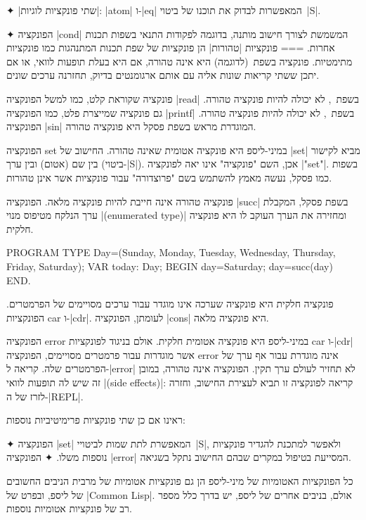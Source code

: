 ✦ \ע|שתי פונקציות לוגיות|: \E|atom| ו-\E|eq| המאפשרות לבדוק את תוכנו של
ביטוי~\E|S|.

✦ הפונקציה \E|cond| המשמשת לצורך חישוב מותנה, בדוגמה לפקודות התנאי בשפות
  תכנות אחרות.
===
פונקציות \ע|טהורות| הן פונקציות של שפת תכנות המתנהגות כמו פונקציות מתימטיות.
פונקציה בשפת~\CPL(לדוגמה) היא אינה טהורה, אם היא בעלת תופעות לוואי, או אם יתכן
ששתי קריאות שונות אליה עם אותם ארגומנטים בדיוק, תחזרנה ערכים שונים.

פונקציה שקוראת קלט, כמו למשל הפונקציה \E|read| בשפת~\CPL, לא יכולה להיות
פונקציה טהורה. גם פונקציה שמייצרת פלט, כמו הפונקציה \E|printf| בשפת~\CPL,
לא יכולה להיות פונקציה טהורה. הפונקציה \E|sin| המוגדרת מראש בשפת פסקל היא
פונקציה טהורה.

הפונקציה set במיני-ליספ היא פונקציה אטומית שאינה טהורה. החישוב של \E|set| מביא
לקישור בין שם (אטום) ובין ערך (ביטוי-\E|S|). אכן, השם "פונקציה" אינו יאה
לפונקציה \E|"set"|. בשפות כמו פסקל, נעשה מאמץ להשתמש בשם "פרוצדורה" עבור
פונקציות אשר אינן טהורות.

פונקציה טהורה אינה חייבת להיות פונקציה מלאה. הפונקציה \E|succ| בשפת פסקל,
המקבלת ערך הנלקח מטיפוס מנוי \E|(enumerated type)| ומחזירה את הערך
העוקב לו היא פונקציה חלקית.
\begin{Pascal}
PROGRAM
TYPE Day=(Sunday, Monday, Tuesday, Wednesday, Thursday, Friday, Saturday);
VAR today: Day;
BEGIN day=Saturday; day=succ(day) END.
\end{Pascal}

פונקציה חלקית היא פונקציה שערכה אינו מוגדר עבור ערכים מסויימים של הפרמטרים.
הפונקציות car ו-\E|cdr|. לעומתן, הפונקציה \E|cons| היא פונקציה מלאה.

הפונקציה error במיני-ליספ היא פונקציה אטומית חלקית. אולם בניגוד לפונקציות car
ו-\E|cdr| אשר מוגדרות עבור פרמטרים מסויימים, הפונקציה error אינה מוגדרת עבור
אף ערך של הפרמטרים שלה. קריאה ל-\E|error| לא תחזיר לעולם ערך תקין.
הפונקציה אינה טהורה, במובן זה שיש לה תופעות לוואי \E|(side effects)|: קריאה
לפונקציה זו תביא לעצירת החישוב, וחזרה לזרז של ה-\E|REPL|.

ראינו אם כן שתי פונקציות פרימיטיביות נוספות:
\begin{itemize}
  ✦ הפונקציה \E|set| המאפשרת לתת שמות לביטויי~\E|S|, ולאפשר למתכנת להגדיר
  פונקציות נוספות משלו.
  ✦ הפונקציה \E|error| המסייעת בטיפול במקרים שבהם החישוב נתקל בשגיאה.
\end{itemize}
כל הפונקציות האטומיות של מיני-ליספ הן גם פונקציות אטומיות של מרבית הניבים
החשובים של ליספ, ובפרט של \E|Common Lisp|. אולם, בניבים אחרים של ליספ, יש בדרך
כלל מספר רב של פונקציות אטומיות נוספות.


